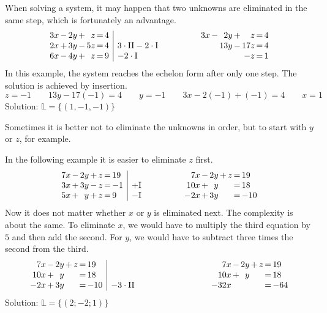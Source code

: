 \documentclass[12pt,eng]{skript_ogg}
\begin{document}
\begin{bemerkung}
When solving a system, it may happen that two unknowns are eliminated in the same step, which is fortunately an advantage.
\[\begin{array}{r@{\,}c@{\,}r@{\,}c@{\,}r@{\,}c@{\,}l|l}
3x & - & 2y & + & z & = & 4 &\\
2x & + & 3y & - & 5z & = & 4 & 3\cdot\mbox{II}-2\cdot\mbox{I}\\
6x & - & 4y & + & z & = & 9 & -2\cdot\mbox{I}
\end{array}\qquad\qquad\begin{array}{r@{\,}c@{\,}r@{\,}c@{\,}r@{\,}c@{\,}l}
3x & - & 2y & + & z & = & 4 \\
 & & 13y & - & 17z & = & 4 \\
 & & & & -z & = & 1
\end{array}\]
In this example, the system reaches the echelon form after only one step. The solution is achieved by insertion.
\[z=-1\qquad 13y-17(-1)=4\qquad y=-1\qquad 3x-2(-1)+(-1)=4\qquad x=1\]
Solution: $\mathbb{L}=\{(1,-1,-1)\}$

Sometimes it is better not to eliminate the unknowns in order, but to start with $y$ or $z$, for example.

In the following example it is easier to eliminate $z$ first.
\[\begin{array}{r@{\,}c@{\,}r@{\,}c@{\,}r@{\,}c@{\,}l|l}
7x & - & 2y & + & z & = & 19 &\\
3x & + & 3y & - & z & = & -1 & +\mbox{I}\\
5x & + & y & + & z & = & 9 & -\mbox{I}
\end{array}\qquad\qquad\begin{array}{r@{\,}c@{\,}r@{\,}c@{\,}r@{\,}c@{\,}l}
7x & - & 2y & + & z & = & 19 \\
10x & + & y & & & = & 18 \\
-2x & + & 3y & & & = & -10
\end{array}\]
Now it does not matter whether $x$ or $y$ is eliminated next. The complexity is about the same. To eliminate $x$, we would have to multiply the third equation by $5$ and then add the second. For $y$, we would have to subtract three times the second from the third.
\[\begin{array}{r@{\,}c@{\,}r@{\,}c@{\,}r@{\,}c@{\,}l|l}
7x & - & 2y & + & z & = & 19 &\\
10x & + & y & & & = & 18 &\\
-2x & + & 3y & & & = & -10 & -3\cdot\mbox{II}
\end{array}\qquad\qquad\qquad\qquad\begin{array}{r@{\,}c@{\,}r@{\,}c@{\,}r@{\,}c@{\,}l}
7x & - & 2y & + & z & = & 19 \\
10x & + & y & & & = & 18 \\
-32x & & & & & = & -64
\end{array}\]
Solution: $\mathbb{L}=\{(2;-2;1)\}$
\end{bemerkung}
\end{document}
